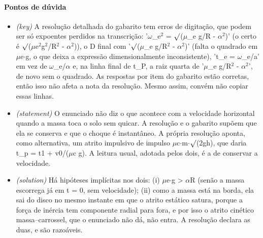 \documentclass{article}%
\begin{document}
\paragraph{Pontos de dúvida}%
\begin{itemize}%
\item%
\textit{(key)} A resolução detalhada do gabarito tem erros de digitação, que podem ser só expoentes perdidos na transcrição: '$\omega$\_e$^2$ = $\surd$($\mu$\_e g/R - $\alpha$$^2$)' (o certo é $\surd$($\mu$e$^2$g$^2$/R$^2$ - $\alpha$$^2$)), o D final com '$\surd$($\mu$\_e g/R$^2$ - $\alpha$$^2$)' (falta o quadrado em $\mu$e$\cdot$g, o que deixa a expressão dimensionalmente inconsistente), 't\_e = $\omega$\_e/a' em vez de $\omega$\_e/$\alpha$ e, na linha final de t\_P, a raiz quarta de '$\mu$\_e g/R$^2$ - $\alpha$$^2$', de novo sem o quadrado. As respostas por item do gabarito estão corretas, então isso não afeta a nota da resolução. Mesmo assim, convém não copiar essas linhas.%
\item%
\textit{(statement)} O enunciado não diz o que acontece com a velocidade horizontal quando a massa toca o solo sem quicar. A resolução e o gabarito supõem que ela se conserva e que o choque é instantâneo. A própria resolução aponta, como alternativa, um atrito impulsivo de impulso $\mu$c$\cdot$m$\cdot$$\surd$(2gh), que daria t\_p = t1 + v0/($\mu$c g). A leitura usual, adotada pelos dois, é a de conservar a velocidade.%
\item%
\textit{(solution)} Há hipóteses implícitas nos dois: (i) $\mu$e$\cdot$g > $\alpha$R (senão a massa escorrega já em t = 0, sem velocidade); (ii) como a massa está na borda, ela sai do disco no mesmo instante em que o atrito estático satura, porque a força de inércia tem componente radial para fora, e por isso o atrito cinético massa--carrossel, que o enunciado não dá, não entra. A resolução declara as duas, e são razoáveis.%
\end{itemize}%
\end{document}
